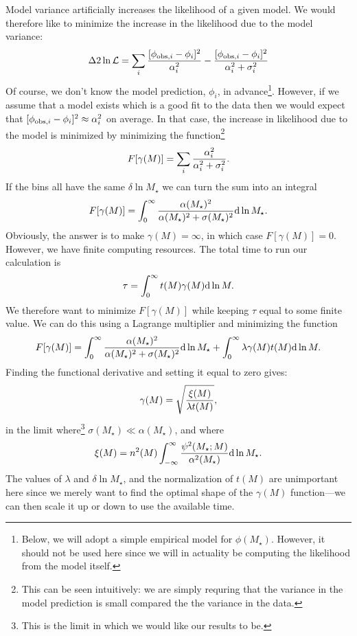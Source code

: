 Model variance artificially increases the likelihood of a given model. We would therefore like to minimize the increase in the likelihood due to the model variance:
\begin{equation}
\Delta 2 \ln \mathcal{L} = \sum_i {[\phi_{{\rm obs},i} - \phi_i]^2 \over \alpha_i^2} - {[\phi_{{\rm obs},i} - \phi_i]^2 \over \alpha_i^2 + \sigma_i^2} 
\end{equation}
Of course, we don't know the model prediction, $\phi_i$, in advance\footnote{Below, we will adopt a simple empirical model for $\phi(M_\star)$. However, it should not be used here since we will in actuality be computing the likelihood from the model itself.}. However, if we assume that a model exists which is a good fit to the data then we would expect that $[\phi_{{\rm obs},i} - \phi_i]^2 \approx \alpha_i^2$ on average. In that case, the increase in likelihood due to the model is minimized by minimizing the function\footnote{This can be seen intuitively: we are simply requring that the variance in the model prediction is small compared the the variance in the data.}
\begin{equation}
 F[\gamma(M)] = \sum_i {\alpha_i^2 \over \alpha_i^2 + \sigma_i^2}.
\end{equation}
If the bins all have the same $\delta \ln M_\star$ we can turn the sum into an integral
\begin{equation}
 F[\gamma(M)] = \int_0^\infty {\alpha(M_\star)^2 \over \alpha(M_\star)^2 + \sigma(M_\star)^2} \d \ln M_\star.
\end{equation}
Obviously, the answer is to make $\gamma(M)=\infty$, in which case $ F[\gamma(M)]=0$. However, we have finite computing resources. The total time to run our calculation is
\begin{equation}
 \tau = \int_0^\infty t(M) \gamma(M) \d \ln M.
\end{equation}
We therefore want to minimize $F[\gamma(M)]$ while keeping $\tau$ equal to some finite value. We can do this using a Lagrange multiplier and minimizing the function
\begin{equation}
  F[\gamma(M)] = \int_0^\infty {\alpha(M_\star)^2 \over \alpha(M_\star)^2 + \sigma(M_\star)^2} \d \ln M_\star + \int_0^\infty \lambda \gamma(M) t(M) \d \ln M.
\end{equation}
Finding the functional derivative and setting it equal to zero gives:
\begin{equation}
 \gamma(M) = \sqrt{{\xi(M) \over \lambda t(M)}},
\end{equation}
in the limit where\footnote{This is the limit in which we would like our results to be.} $\sigma(M_\star) \ll \alpha(M_\star)$, and where
\begin{equation}
 \xi(M) = n^2(M) \int_{-\infty}^\infty {\psi^2(M_\star;M) \over \alpha^2(M_\star)} \d \ln M_\star.
\end{equation}
The values of $\lambda$ and $\delta \ln M_\star$, and the normalization of $t(M)$ are unimportant here since we merely want to find the optimal shape of the $\gamma(M)$ function---we can then scale it up or down to use the available time.

